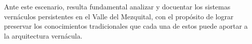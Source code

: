 
Ante este escenario, resulta fundamental analizar y docuentar los sistemas vernáculos persistentes en el Valle del Mezquital, con el propósito de lograr preservar los conocimientos tradicionales que cada una de estos puede aportar a la arquitectura vernácula.
